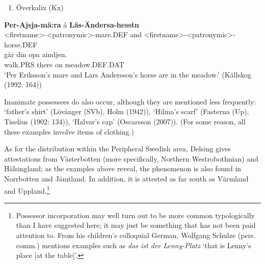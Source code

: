 \begin{enumerate} %
\item 
Överkalix (Kx)

\end{enumerate} %
\ea\label{}
\gll \textbf{Per-Ajsja-mä:ra} å  \textbf{Läs-Ändersa-hesstn}\\


{\textless}firstname{\textgreater}-{\textless}patronymic{\textgreater}-mare.DEF  and  {\textless}firstname{\textgreater}-{\textless}patronymic{\textgreater}-horse.DEF\\ %


\ea\label{}
\gll gär  din  opa  aindjen.\\


walk.PRS  there  on  meadow.DEF.DAT\\ %


‘Per Eriksson’s mare and Lars Andersson’s horse are in the meadow.’ (Källskog (1992: 164))
\z

Inanimate possessees do also occur, although they are mentioned less frequently:  ‘father’s shirt’ (Lövånger (SVb), Holm (1942)),  ‘Hilma’s scarf’ (Fasterna (Up), Tiselius (1902: 134)),  ‘Halvar’s cap’ (Oscarsson (2007)). (For some reason, all these examples involve items of clothing.)

As for the distribution within the Peripheral Swedish area, Delsing gives attestations from Västerbotten (more specifically, Northern Westrobothnian) and Hälsingland; as the examples above reveal, the phenomenon is also found in Norrbotten and Jämtland. In addition, it is attested as far south as Värmland and Uppland.\footnote{ Possessor incorporation may well turn out to be more common typologically than I have suggested here; it may just be something that has not been paid attention to. From his children’s colloquial German, Wolfgang Schulze (pers. comm.) mentions examples such as \textit{das ist der Lenny-Platz} ‘that is Lenny’s place [at the table]’.\par }

